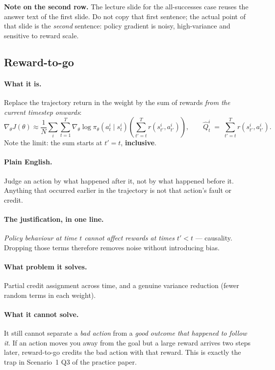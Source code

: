 \documentclass[11pt,a4paper]{article}
\begin{document}
\noindent\textbf{Note on the second row.} The lecture slide for the
all-successes case reuses the answer text of the first slide. Do not copy that
first sentence; the actual point of that slide is the \emph{second} sentence:
policy gradient is noisy, high-variance and sensitive to reward scale.

\subsection{Reward-to-go}

\paragraph{What it is.} Replace the trajectory return in the weight by the sum
of rewards \emph{from the current timestep onwards}:
\[
\nabla_\theta J(\theta)\approx \frac1N\sum_i\sum_{t=1}^T
\nabla_\theta\log\pi_\theta(a^i_t\mid s^i_t)
\left(\sum_{t'=t}^{T} r(s^i_{t'},a^i_{t'})\right),
\qquad
\hat Q^i_t \;=\; \sum_{t'=t}^{T} r(s^i_{t'},a^i_{t'}).
\]
Note the limit: the sum starts at $t'=t$, \textbf{inclusive}.

\paragraph{Plain English.} Judge an action by what happened after it, not by
what happened before it. Anything that occurred earlier in the trajectory is
not that action's fault or credit.

\paragraph{The justification, in one line.} \emph{Policy behaviour at time $t$
cannot affect rewards at times $t'<t$} --- causality. Dropping those terms
therefore removes noise without introducing bias.

\paragraph{What problem it solves.} Partial credit assignment across time, and
a genuine variance reduction (fewer random terms in each weight).

\paragraph{What it cannot solve.} It still cannot separate a \emph{bad action}
from a \emph{good outcome that happened to follow it}. If an action moves you
away from the goal but a large reward arrives two steps later, reward-to-go
credits the bad action with that reward. This is exactly the trap in
Scenario~1 Q3 of the practice paper.
\end{document}
